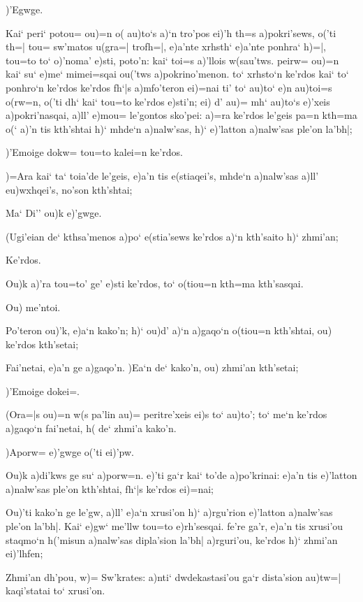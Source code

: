 \documentclass[11pt]{book}
\newcommand {\Spag} {\Npag*{=+1}\Npar{1}\numerus{1}}
\newcommand {\Spar} {\Npar*{=+1}\numerus{1}}
\begin{document}
\2 )'Egwge.

\1 Kai` peri` potou= ou)=n o( au)to`s a)`n tro'pos ei)'h th=s a)pokri'sews,
o('ti th=| tou= sw'matos u(gra=| trofh=|, e)a'nte xrhsth`
\Spag %
 e)a'nte ponhra` h)=|, tou=to to` o)'noma' e)sti, poto'n: kai` toi=s
a)'llois w(sau'tws. peirw= ou)=n kai` su` e)me` mimei=sqai ou('tws
a)pokrino'menon. to` xrhsto`n ke'rdos kai` to` ponhro`n ke'rdos ke'rdos fh`|s
a)mfo'teron ei)=nai ti' to` au)to` e)n au)toi=s o(rw=n, o('ti dh` kai` tou=to
ke'rdos e)sti'n; ei) d' au)= mh` au)to`s e)'xeis a)pokri'nasqai, a)ll' e)mou=
le'gontos sko'pei: a)=ra ke'rdos le'geis pa=n kth=ma o(` a)'n tis kth'shtai
h)` mhde`n a)nalw'sas, h)` e)'latton a)nalw'sas ple'on la'bh|;

\2 \Spar )'Emoige dokw= tou=to kalei=n ke'rdos.

\1 )=Ara kai` ta` toia'de le'geis, e)a'n tis e(stiaqei's, mhde`n a)nalw'sas
a)ll' eu)wxhqei's, no'son kth'shtai;

\2 Ma` Di'' ou)k e)'gwge.

\1 (Ugi'eian de` kthsa'menos a)po` e(stia'sews ke'rdos a)`n kth'saito h)`
zhmi'an;

\2 Ke'rdos.

\1 Ou)k a)'ra tou=to' ge' e)sti ke'rdos, to` o(tiou=n kth=ma kth'sasqai.

\2 Ou) me'ntoi.

\1 Po'teron ou)'k, e)a`n kako'n; h)` ou)d' a)`n a)gaqo`n o(tiou=n kth'shtai, ou)
ke'rdos kth'setai;

\2 Fai'netai, e)a'n ge a)gaqo'n.
\1 \Spar )Ea`n de` kako'n, ou) zhmi'an kth'setai;

\2 )'Emoige dokei=.

\1 (Ora=|s ou)=n w(s pa'lin au)= peritre'xeis ei)s to` au)to'; to` me`n ke'rdos
a)gaqo`n fai'netai, h( de` zhmi'a kako'n.

\2 )Aporw= e)'gwge o('ti ei)'pw.

\1 Ou)k a)di'kws ge su` a)porw=n. e)'ti ga`r kai` to'de a)po'krinai: e)a'n tis
e)'latton a)nalw'sas ple'on kth'shtai, fh`|s ke'rdos ei)=nai;

\2 Ou)'ti kako'n ge le'gw, a)ll' e)a`n xrusi'on h)` a)rgu'rion e)'latton
a)nalw'sas ple'on la'bh|.
\1 \Spar Kai` e)gw` me'llw tou=to e)rh'sesqai. fe're ga'r, e)a'n tis xrusi'ou staqmo`n
h('misun a)nalw'sas dipla'sion la'bh| a)rguri'ou, ke'rdos h)` zhmi'an
ei)'lhfen;

\2 Zhmi'an dh'pou, w)= Sw'krates: a)nti` dwdekastasi'ou ga`r dista'sion au)tw=|
kaqi'statai to` xrusi'on.
\end{document}
